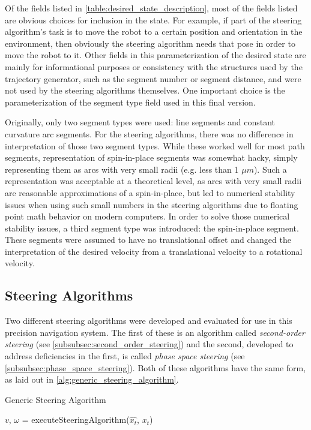Of the fields listed in \autoref{table:desired_state_description}, most of the fields listed are obvious choices for inclusion in the state. For example, if part of the steering algorithm's task is to move the robot to a certain position and orientation in the environment, then obviously the steering algorithm needs that pose in order to move the robot to it. Other fields in this parameterization of the desired state are mainly for informational purposes or consistency with the structures used by the trajectory generator, such as the segment number or segment distance, and were not used by the steering algorithms themselves. One important choice is the parameterization of the segment type field used in this final version.

Originally, only two segment types were used: line segments and constant curvature arc segments. For the steering algorithms, there was no difference in interpretation of those two segment types. While these worked well for most path segments, representation of spin-in-place segments was somewhat hacky, simply representing them as arcs with very small radii (e.g. less than 1 $\mu m$). Such a representation was acceptable at a theoretical level, as arcs with very small radii are reasonable approximations of a spin-in-place, but led to numerical stability issues when using such small numbers in the steering algorithms due to floating point math behavior on modern computers. In order to solve those numerical stability issues, a third segment type was introduced: the spin-in-place segment. These segments were assumed to have no translational offset and changed the interpretation of the desired velocity from a translational velocity to a rotational velocity.

\subsection{Steering Algorithms}\label{subsec:steering_algorithms}

Two different steering algorithms were developed and evaluated for use in this precision navigation system. The first of these is an algorithm called \emph{second-order steering} (see \autoref{subsubsec:second_order_steering}) and the second, developed to address deficiencies in the first, is called \emph{phase space steering} (see \autoref{subsubsec:phase_space_steering}). Both of these algorithms have the same form, as laid out in \autoref{alg:generic_steering_algorithm}.

\begin{algorithm}
\caption{Generic Steering Algorithm}
\label{alg:generic_steering_algorithm}
\DontPrintSemicolon


$v$, $\omega$ = executeSteeringAlgorithm($\hat{x_t}$, $x_t$)\;

\end{algorithm}

